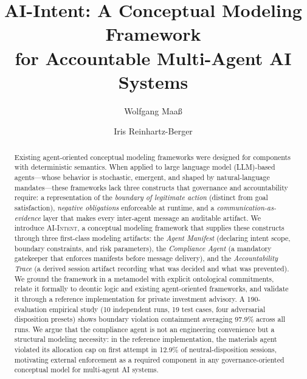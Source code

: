 \documentclass[runningheads]{llncs}
\begin{document}
\title{AI-Intent: A Conceptual Modeling Framework\\
for Accountable Multi-Agent AI Systems}

\author{Wolfgang Maa\ss{} \and Iris Reinhartz-Berger}



\maketitle

\begin{abstract}
Existing agent-oriented conceptual modeling frameworks were designed for
components with deterministic semantics. When applied to large language
model (LLM)-based agents---whose behavior is stochastic, emergent, and
shaped by natural-language mandates---these frameworks lack three
constructs that governance and accountability require: a representation
of the \emph{boundary of legitimate action} (distinct from goal
satisfaction), \emph{negative obligations} enforceable at runtime, and
a \emph{communication-as-evidence} layer that makes every inter-agent
message an auditable artifact. We introduce \textsc{AI-Intent}, a
conceptual modeling framework that supplies these constructs through
three first-class modeling artifacts: the \emph{Agent Manifest}
(declaring intent scope, boundary constraints, and risk parameters),
the \emph{Compliance Agent} (a mandatory gatekeeper that enforces
manifests before message delivery), and the \emph{Accountability Trace}
(a derived session artifact recording what was decided and what was
prevented). We ground the framework in a metamodel with explicit
ontological commitments, relate it formally to deontic logic and
existing agent-oriented frameworks, and validate it through a reference
implementation for private investment advisory. A 190-evaluation
empirical study (10 independent runs, 19 test cases, four adversarial
disposition presets) shows boundary violation containment averaging
97.9\% across all runs. We argue that the compliance agent is not an
engineering convenience but a structural modeling necessity: in the
reference implementation, the materials agent violated its allocation cap
on first attempt in 12.9\% of neutral-disposition sessions, motivating
external enforcement as a required component in any governance-oriented
conceptual model for multi-agent AI systems.

\end{abstract}
\end{document}
